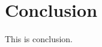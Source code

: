\documentclass[twocolumn,3p,authoryear]{elsarticle}
\begin{document}
\newpage




\section{Conclusion}
This is conclusion.
\newpage





\appendix




\end{document}
